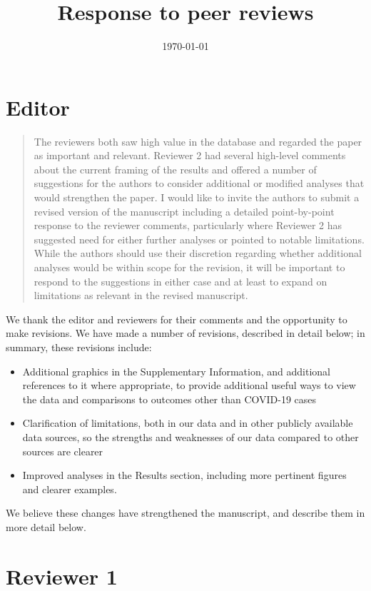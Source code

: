 \documentclass[11pt]{article}
\title{Response to peer reviews}
\author{}
\date{\today}
\begin{document}
\maketitle

\section*{Editor}

\begin{quote}
  The reviewers both saw high value in the database and regarded the paper as
  important and relevant. Reviewer 2 had several high-level comments about the
  current framing of the results and offered a number of suggestions for the
  authors to consider additional or modified analyses that would strengthen the
  paper. I would like to invite the authors to submit a revised version of the
  manuscript including a detailed point-by-point response to the reviewer
  comments, particularly where Reviewer 2 has suggested need for either further
  analyses or pointed to notable limitations. While the authors should use their
  discretion regarding whether additional analyses would be within scope for the
  revision, it will be important to respond to the suggestions in either case
  and at least to expand on limitations as relevant in the revised manuscript.
\end{quote}
We thank the editor and reviewers for their comments and the opportunity to make
revisions. We have made a number of revisions, described in detail below; in
summary, these revisions include:
\begin{itemize}
\item Additional graphics in the Supplementary Information, and additional
  references to it where appropriate, to provide additional useful ways to view
  the data and comparisons to outcomes other than COVID-19 cases

\item Clarification of limitations, both in our data and in other publicly
  available data sources, so the strengths and weaknesses of our data compared
  to other sources are clearer

\item Improved analyses in the Results section, including more pertinent figures
  and clearer examples.
\end{itemize}
We believe these changes have strengthened the manuscript, and describe them in
more detail below.

\section*{Reviewer 1}
\end{document}
